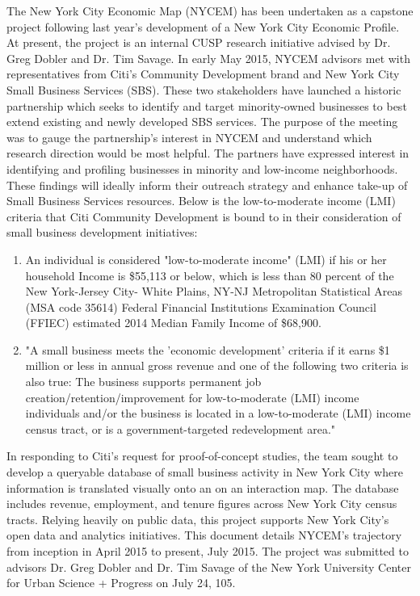 \documentclass[article, 11pt]{article} %
\begin{document}
The New York City Economic Map (NYCEM) has been undertaken as a capstone project following last year's development of a New York City Economic Profile. At present, the project is an internal CUSP research initiative advised by Dr. Greg Dobler and Dr. Tim Savage. In early May 2015, NYCEM advisors met with representatives from Citi's Community Development brand and New York City Small Business Services (SBS). These two stakeholders have launched a historic partnership which seeks to identify and target minority-owned businesses to best extend existing and newly developed SBS services. The purpose of the meeting was to gauge the partnership's interest in NYCEM and understand which research direction would be most helpful. The partners have expressed interest in identifying and profiling businesses in minority and low-income neighborhoods. These findings will ideally inform their outreach strategy and enhance take-up of Small Business Services resources.
\setlength{\parskip}{6pt}
Below is the low-to-moderate income (LMI) criteria that Citi Community Development
is bound to in their consideration of small business development initiatives:
\setlength{\parskip}{6pt}
\begin{enumerate}
\item An individual is considered "low-to-moderate income" (LMI) if his or her household Income is \$55,113 or below, which is less than 80 percent of the New York-Jersey City-
White Plains, NY-NJ Metropolitan Statistical Areas (MSA code 35614) Federal
Financial Institutions Examination Council (FFIEC) estimated 2014 Median Family
Income of \$68,900.
\item "A small business meets the 'economic development' criteria if it earns \$1 million or less in annual gross revenue and one of the following two criteria is also true:
The business supports permanent job creation/retention/improvement for low-to-moderate (LMI) income individuals and/or the business is located in a low-to-moderate (LMI) income census tract, or is a government-targeted redevelopment area."
\end{enumerate}
\setlength{\parskip}{6pt}
In responding to Citi's request for proof-of-concept studies, the team sought to develop a queryable database of small business activity in New York City where information is translated visually onto an on an interaction map. The database includes revenue, employment, and tenure figures across New York City census tracts. Relying heavily on public data, this project supports New York City's open data and analytics initiatives.
\setlength{\parskip}{6pt}
This document details NYCEM's trajectory from inception in April 2015 to present, July 2015. The project was submitted to advisors Dr. Greg Dobler and Dr. Tim Savage of the New York University Center for Urban Science + Progress on July 24, 105.
\end{document}

